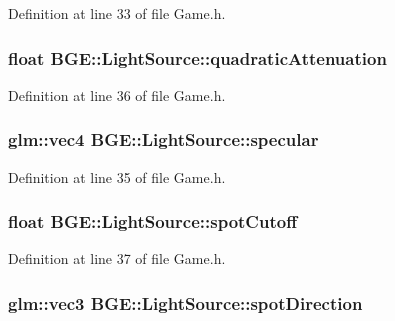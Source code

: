 Definition at line 33 of file Game.\-h.

\hypertarget{struct_b_g_e_1_1_light_source_a581921dd0a5dff19b57b65a9995d06fa}{
\subsubsection[{quadratic\-Attenuation}]{\setlength{\rightskip}{0pt plus 5cm}float B\-G\-E\-::\-Light\-Source\-::quadratic\-Attenuation}}\label{struct_b_g_e_1_1_light_source_a581921dd0a5dff19b57b65a9995d06fa}


Definition at line 36 of file Game.\-h.

\hypertarget{struct_b_g_e_1_1_light_source_ad722db2928ed5e2ab40dbb2ca44c1b00}{
\subsubsection[{specular}]{\setlength{\rightskip}{0pt plus 5cm}glm\-::vec4 B\-G\-E\-::\-Light\-Source\-::specular}}\label{struct_b_g_e_1_1_light_source_ad722db2928ed5e2ab40dbb2ca44c1b00}


Definition at line 35 of file Game.\-h.

\hypertarget{struct_b_g_e_1_1_light_source_adb5adef9bf599b87ddcd2b20c63213c4}{
\subsubsection[{spot\-Cutoff}]{\setlength{\rightskip}{0pt plus 5cm}float B\-G\-E\-::\-Light\-Source\-::spot\-Cutoff}}\label{struct_b_g_e_1_1_light_source_adb5adef9bf599b87ddcd2b20c63213c4}


Definition at line 37 of file Game.\-h.

\hypertarget{struct_b_g_e_1_1_light_source_a8e4da47dd39e89932cda39938d92c90c}{
\subsubsection[{spot\-Direction}]{\setlength{\rightskip}{0pt plus 5cm}glm\-::vec3 B\-G\-E\-::\-Light\-Source\-::spot\-Direction}}\label{struct_b_g_e_1_1_light_source_a8e4da47dd39e89932cda39938d92c90c}


